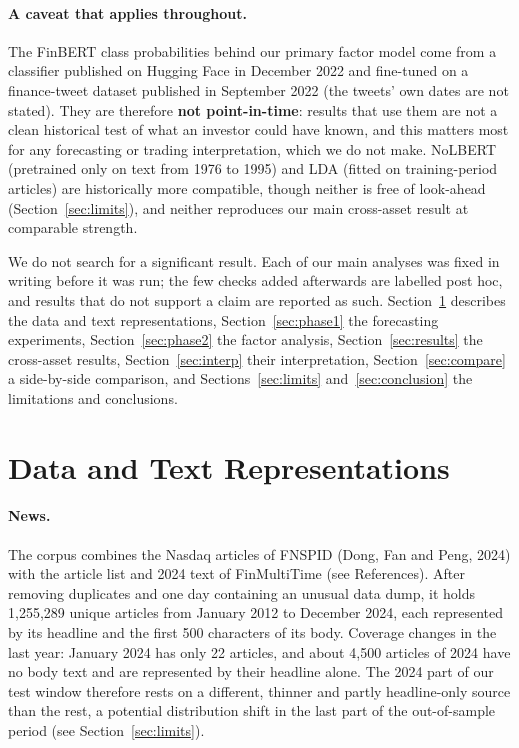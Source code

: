\documentclass[11pt]{article}
\begin{document}
\paragraph{A caveat that applies throughout.} The FinBERT class probabilities behind our primary factor model come from a classifier published on Hugging Face in December 2022 and fine-tuned on a finance-tweet dataset published in September 2022 (the tweets' own dates are not stated). They are therefore \textbf{not point-in-time}: results that use them are not a clean historical test of what an investor could have known, and this matters most for any forecasting or trading interpretation, which we do not make. NoLBERT (pretrained only on text from 1976 to 1995) and LDA (fitted on training-period articles) are historically more compatible, though neither is free of look-ahead (Section~\ref{sec:limits}), and neither reproduces our main cross-asset result at comparable strength.

We do not search for a significant result. Each of our main analyses was fixed in writing before it was run; the few checks added afterwards are labelled post hoc, and results that do not support a claim are reported as such. Section~\ref{sec:data} describes the data and text representations, Section~\ref{sec:phase1} the forecasting experiments, Section~\ref{sec:phase2} the factor analysis, Section~\ref{sec:results} the cross-asset results, Section~\ref{sec:interp} their interpretation, Section~\ref{sec:compare} a side-by-side comparison, and Sections~\ref{sec:limits} and~\ref{sec:conclusion} the limitations and conclusions.

\section{Data and Text Representations}
\label{sec:data}

\paragraph{News.} The corpus combines the Nasdaq articles of FNSPID (Dong, Fan and Peng, 2024) with the article list and 2024 text of FinMultiTime (see References). After removing duplicates and one day containing an unusual data dump, it holds 1{,}255{,}289 unique articles from January 2012 to December 2024, each represented by its headline and the first 500 characters of its body. Coverage changes in the last year: January 2024 has only 22 articles, and about 4{,}500 articles of 2024 have no body text and are represented by their headline alone. The 2024 part of our test window therefore rests on a different, thinner and partly headline-only source than the rest, a potential distribution shift in the last part of the out-of-sample period (see Section~\ref{sec:limits}).
\end{document}
